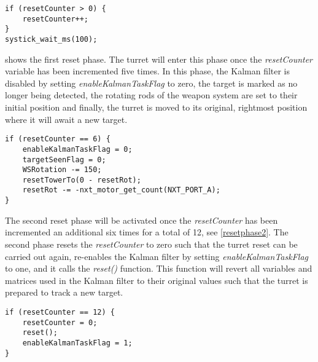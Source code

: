 \begin{lstlisting}[style=customc, label={resetinc}, caption={Incrementing the reset counter}]
if (resetCounter > 0) {
    resetCounter++;
}
systick_wait_ms(100);
\end{lstlisting}

 shows the first reset phase. The turret will enter this phase once the \emph{resetCounter} variable has been incremented five times. In this phase, the Kalman filter is disabled by setting \emph{enableKalmanTaskFlag} to zero, the target is marked as no longer being detected, the rotating rods of the weapon system are set to their initial position and finally, the turret is moved to its original, rightmost position where it will await a new target.

\begin{lstlisting}[style=customc, label={resetphase1}, caption={Reset phase 1}]
if (resetCounter == 6) {
    enableKalmanTaskFlag = 0;
    targetSeenFlag = 0;
    WSRotation -= 150;
    resetTowerTo(0 - resetRot);
    resetRot -= -nxt_motor_get_count(NXT_PORT_A);
}
\end{lstlisting}

The second reset phase will be activated once the \emph{resetCounter} has been incremented an additional six times for a total of 12, see \cref{resetphase2}. The second phase resets the \emph{resetCounter} to zero such that the turret reset can be carried out again, re-enables the Kalman filter by setting \emph{enableKalmanTaskFlag} to one, and it calls the \emph{reset()} function. This function will revert all variables and matrices used in the Kalman filter to their original values such that the turret is prepared to track a new target. 

\begin{lstlisting}[style=customc, label={resetphase2}, caption={Reset phase 2}]
if (resetCounter == 12) {
    resetCounter = 0;
    reset();
    enableKalmanTaskFlag = 1;
}
\end{lstlisting}



